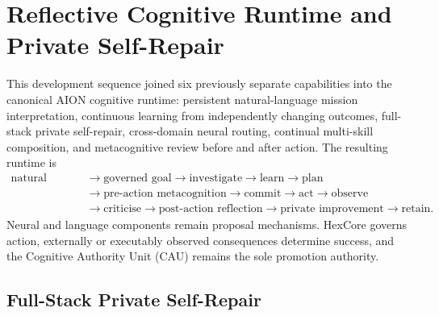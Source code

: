
\section{Reflective Cognitive Runtime and Private Self-Repair}
\label{sec:aion-integrated-runtime-repair-metacognition}

This development sequence joined six previously separate capabilities into the
canonical AION cognitive runtime: persistent natural-language mission
interpretation, continuous learning from independently changing outcomes,
full-stack private self-repair, cross-domain neural routing, continual
multi-skill composition, and metacognitive review before and after action.  The
resulting runtime is
\begin{equation}
\begin{aligned}
\text{natural mission}
&\rightarrow \text{governed goal}
\rightarrow \text{investigate}
\rightarrow \text{learn}
\rightarrow \text{plan} \\
&\rightarrow \text{pre-action metacognition}
\rightarrow \text{commit}
\rightarrow \text{act}
\rightarrow \text{observe} \\
&\rightarrow \text{criticise}
\rightarrow \text{post-action reflection}
\rightarrow \text{private improvement}
\rightarrow \text{retain}.
\end{aligned}
\label{eq:aion-reflective-cognitive-loop}
\end{equation}
Neural and language components remain proposal mechanisms.  HexCore governs
action, externally or executably observed consequences determine success, and
the Cognitive Authority Unit (CAU) remains the sole promotion authority.

\subsection{Full-Stack Private Self-Repair}
\label{subsec:aion-full-stack-private-repair}

